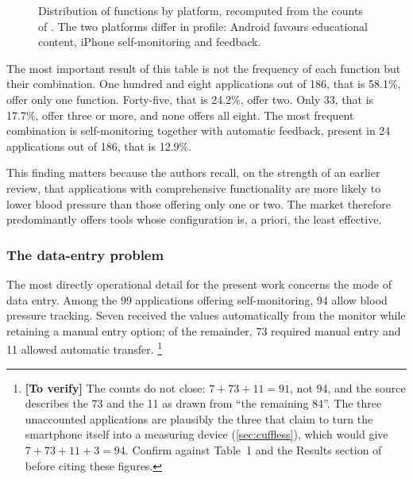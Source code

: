 \documentclass[12pt,a4paper,oneside]{report}
\newcommand{\verify}[1]{\footnote{\textbf{[To verify]} #1}}
\begin{document}
\begin{figure}[htbp]
\centering
{}
\caption{Distribution of functions by platform, recomputed from the counts of \textcite{alessa2019}. The two platforms differ in profile: Android favours educational content, iPhone self-monitoring and feedback.}\label{fig:app-features}
\end{figure}

The most important result of this table is not the frequency of each function but their combination. One hundred and eight applications out of 186, that is 58.1\%, offer only one function. Forty-five, that is 24.2\%, offer two. Only 33, that is 17.7\%, offer three or more, and none offers all eight. The most frequent combination is self-monitoring together with automatic feedback, present in 24 applications out of 186, that is 12.9\%.

This finding matters because the authors recall, on the strength of an earlier review, that applications with comprehensive functionality are more likely to lower blood pressure than those offering only one or two. The market therefore predominantly offers tools whose configuration is, a priori, the least effective.

\subsubsection{The data-entry problem}

The most directly operational detail for the present work concerns the mode of data entry. Among the 99 applications offering self-monitoring, 94 allow blood pressure tracking. Seven received the values automatically from the monitor while retaining a manual entry option; of the remainder, 73 required manual entry and 11 allowed automatic transfer.%
\verify{The counts do not close: $7 + 73 + 11 = 91$, not 94, and the source describes the 73 and the 11 as drawn from ``the remaining 84''. The three unaccounted applications are plausibly the three that claim to turn the smartphone itself into a measuring device (\cref{sec:cuffless}), which would give $7+73+11+3 = 94$. Confirm against Table~1 and the Results section of \textcite{alessa2019} before citing these figures.}
\end{document}

